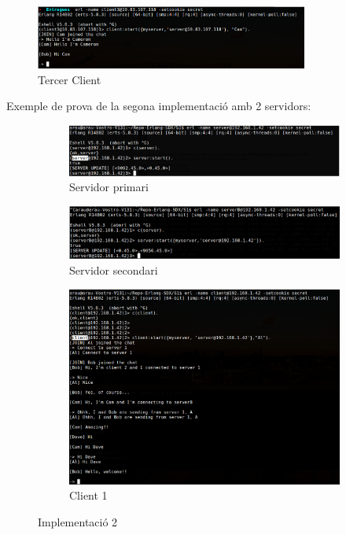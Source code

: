 \documentclass[a4paper, 11pt]{article}
\begin{document}
\begin{figure}[H]
    \centering   
	\includegraphics[width=0.8\textwidth]{figures/Server1_Cam}
    \caption{Tercer Client \label{fig:Impl1_Cam}}	
\end{figure}


Exemple de prova de la segona implementació amb 2 servidors:

\begin{figure}[H]
    \centering
    \begin{subfigure}[b]{0.8\textwidth}
        \includegraphics[width=1.0\textwidth]{figures/ServerA}
        \caption{Servidor primari}
        \label{fig:firstserver}
    \end{subfigure}
    
    \begin{subfigure}[b]{0.8\textwidth}
        \includegraphics[width=1.0\textwidth]{figures/ServerB}
        \caption{Servidor secondari}
        \label{fig:secondserver}
    \end{subfigure}

    \begin{subfigure}[b]{0.8\textwidth}
        \includegraphics[width=1.0\textwidth]{figures/Al}
        \caption{Client 1}
        \label{fig:firstclient}
    \end{subfigure}

    \caption{Implementació 2}
\end{figure}
\end{document}
